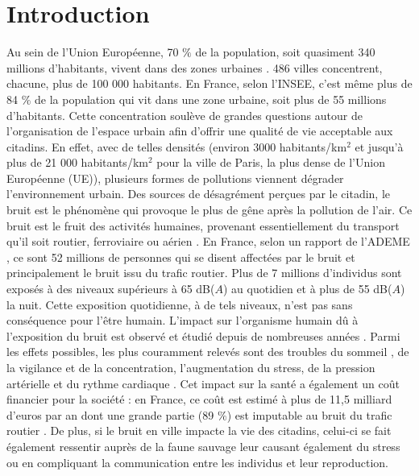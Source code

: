 
\chapter*{Introduction}
\label{chap:intro}


Au sein de l'Union Européenne, 70 $\%$ de la population, soit quasiment 340 millions d'habitants, vivent dans des zones urbaines \cite{europ-commission_data_2017}. 486 villes concentrent, chacune, plus de 100 000 habitants. En France, selon l'INSEE, c'est même plus de 84 $\%$ de la population qui vit dans une zone urbaine, soit plus de 55 millions d'habitants. Cette concentration soulève de grandes questions autour de l'organisation de l'espace urbain afin d'offrir une qualité de vie acceptable aux citadins. En effet, avec de telles densités (environ 3000 habitants/km$^2$ et jusqu'à plus de 21 000  habitants/km$^2$ pour la ville de Paris, la plus dense de l'Union Européenne (UE)), plusieurs formes de pollutions viennent dégrader l'environnement urbain. Des sources de désagrément perçues par le citadin, le bruit est le phénomène qui provoque le plus de gêne après la pollution de l'air. Ce bruit est le fruit des activités humaines, provenant essentiellement du transport qu'il soit routier, ferroviaire ou aérien \cite{zannin_characterization_2013}.
En France, selon un rapport de l'ADEME \cite{europeens2016analyse}, ce sont 52 millions de personnes qui se disent affectées par le bruit et principalement le bruit issu du trafic routier. Plus de 7 millions d'individus sont exposés à des niveaux supérieurs à 65 dB($A$) au quotidien et à plus de 55 dB($A$) la nuit.
Cette exposition quotidienne, à de tels niveaux, n'est pas sans conséquence pour l'être humain. L'impact sur l'organisme humain dû à l'exposition du bruit est observé et étudié depuis de nombreuses années \cite{ising1980health}. Parmi les effets possibles, les plus couramment relevés sont des troubles du sommeil \cite{pirrera2010nocturnal}, de la vigilance et de la concentration, l'augmentation du stress, de la pression artérielle et du rythme cardiaque \cite{babisch2005traffic, babisch2008road}. Cet impact sur la santé a également un coût financier pour la société : en France, ce coût est estimé à plus de 11,5 milliard d'euros par an dont une grande partie (89 $\%$) est imputable au bruit du trafic routier \cite{europeens2016analyse}. De plus, si le bruit en ville impacte la vie des citadins, celui-ci se fait également ressentir auprès de la faune sauvage \cite{dutilleux_anthropogenic_2012, francis2009noise} leur causant également du stress ou en compliquant la communication entre les individus et leur reproduction.\\

